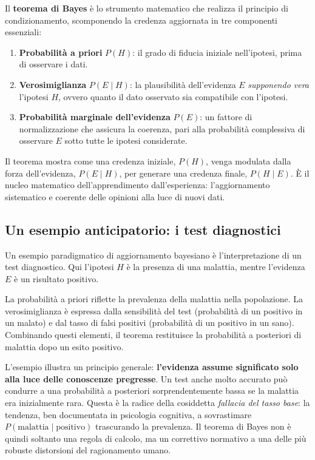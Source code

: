 \documentclass[
  italian,
  letterpaper,
  a4paper,
  11pt,
  open=any]{scrbook}
\providecommand{\tightlist}{%
  \setlength{\itemsep}{0pt}\setlength{\parskip}{0pt}}
\theoremstyle{plain}
\theoremstyle{definition}
\theoremstyle{definition}
\theoremstyle{remark}
\begin{document}
Il \textbf{teorema di Bayes} è lo strumento matematico che realizza il
principio di condizionamento, scomponendo la credenza aggiornata in tre
componenti essenziali:

\begin{enumerate}
\def\labelenumi{\arabic{enumi}.}
\tightlist
\item
  \textbf{Probabilità a priori} \(P(H)\): il grado di fiducia iniziale
  nell'ipotesi, prima di osservare i dati.
\item
  \textbf{Verosimiglianza} \(P(E \mid H)\): la plausibilità
  dell'evidenza \(E\) \emph{supponendo vera} l'ipotesi \(H\), ovvero
  quanto il dato osservato sia compatibile con l'ipotesi.
\item
  \textbf{Probabilità marginale dell'evidenza} \(P(E)\): un fattore di
  normalizzazione che assicura la coerenza, pari alla probabilità
  complessiva di osservare \(E\) sotto tutte le ipotesi considerate.
\end{enumerate}

Il teorema mostra come una credenza iniziale, \(P(H)\), venga modulata
dalla forza dell'evidenza, \(P(E \mid H)\), per generare una credenza
finale, \(P(H \mid E)\). È il nucleo matematico dell'apprendimento
dall'esperienza: l'aggiornamento sistematico e coerente delle opinioni
alla luce di nuovi dati.

\subsection{Un esempio anticipatorio: i test
diagnostici}\label{un-esempio-anticipatorio-i-test-diagnostici}

Un esempio paradigmatico di aggiornamento bayesiano è l'interpretazione
di un test diagnostico. Qui l'ipotesi \(H\) è la presenza di una
malattia, mentre l'evidenza \(E\) è un risultato positivo.

La probabilità a priori riflette la prevalenza della malattia nella
popolazione. La verosimiglianza è espressa dalla sensibilità del test
(probabilità di un positivo in un malato) e dal tasso di falsi positivi
(probabilità di un positivo in un sano). Combinando questi elementi, il
teorema restituisce la probabilità a posteriori di malattia dopo un
esito positivo.

L'esempio illustra un principio generale: \textbf{l'evidenza assume
significato solo alla luce delle conoscenze pregresse}. Un test anche
molto accurato può condurre a una probabilità a posteriori
sorprendentemente bassa se la malattia era inizialmente rara. Questa è
la radice della cosiddetta \emph{fallacia del tasso base}: la tendenza,
ben documentata in psicologia cognitiva, a sovrastimare
\(P(\text{malattia} \mid \text{positivo})\) trascurando la prevalenza.
Il teorema di Bayes non è quindi soltanto una regola di calcolo, ma un
correttivo normativo a una delle più robuste distorsioni del
ragionamento umano.
\end{document}
